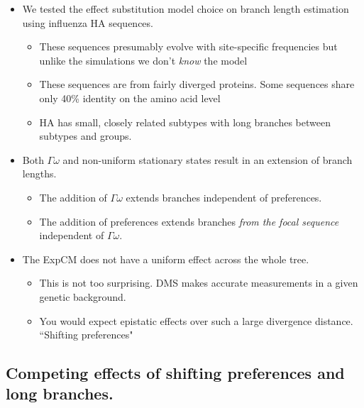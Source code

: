 \documentclass[11pt]{article}
\begin{document}
\begin{itemize}
\item We tested the effect substitution model choice on branch length estimation using influenza HA sequences. 
\begin{itemize}
\item These sequences presumably evolve with site-specific frequencies but unlike the simulations we don't \textit{know} the model
\item These sequences are from fairly diverged proteins. Some sequences share only 40\% identity on the amino acid level 
\item HA has small, closely related subtypes with long branches between subtypes and groups. 
\end{itemize}
\item Both $\Gamma\omega$ and non-uniform stationary states result in an extension of branch lengths. 
\begin{itemize}
\item The addition of $\Gamma\omega$ extends branches independent of preferences. 
\item The addition of preferences extends branches \textit{from the focal sequence} independent of $\Gamma\omega$. 
\end{itemize}
\item The ExpCM does not have a uniform effect across the whole tree. 
\begin{itemize}
\item This is not too surprising. DMS makes accurate measurements in a given genetic background. 
\item You would expect epistatic effects over such a large divergence distance. ``Shifting preferences"
\end{itemize}
\end{itemize}

\subsection*{Competing effects of shifting preferences and long branches.}
\end{document}
